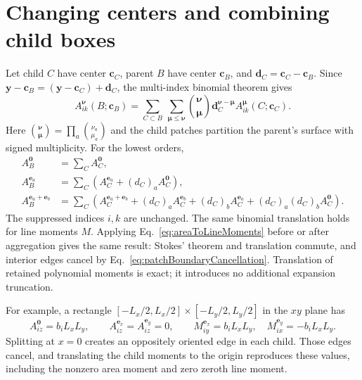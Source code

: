 \section{Changing centers and combining child boxes}
Let child $C$ have center $\bm c_C$, parent $B$ have center $\bm c_B$, and $\bm d_C=\bm c_C-\bm c_B$. Since
$\bm y-\bm c_B=(\bm y-\bm c_C)+\bm d_C$, the multi-index binomial theorem gives
\begin{equation}
 \boxed{A_{ik}^{\boldsymbol\nu}(B;\bm c_B)
 =\sum_{C\subset B}\ \sum_{\boldsymbol\mu\le\boldsymbol\nu}
 {\boldsymbol\nu\choose\boldsymbol\mu}
 \bm d_C^{\boldsymbol\nu-\boldsymbol\mu}
 A_{ik}^{\boldsymbol\mu}(C;\bm c_C).}
 \label{eq:patchM2M}
\end{equation}
Here ${\boldsymbol\nu\choose\boldsymbol\mu}=\prod_a{\nu_a\choose\mu_a}$ and the child patches partition the parent's surface with signed multiplicity. For the lowest orders,
\begin{align}
 A^{\boldsymbol0}_B&=\sum_C A^{\boldsymbol0}_C,\\
 A^{\bm e_a}_B&=\sum_C\left(A^{\bm e_a}_C+(d_C)_aA^{\boldsymbol0}_C\right),\\
 A^{\bm e_a+\bm e_b}_B
 &=\sum_C\left(A^{\bm e_a+\bm e_b}_C
 +(d_C)_aA^{\bm e_b}_C+(d_C)_bA^{\bm e_a}_C
 +(d_C)_a(d_C)_bA^{\boldsymbol0}_C\right).
\end{align}
The suppressed indices $i,k$ are unchanged. The same binomial translation holds for line moments $M$. Applying Eq.~\eqref{eq:areaToLineMoments} before or after aggregation gives the same result: Stokes' theorem and translation commute, and interior edges cancel by Eq.~\eqref{eq:patchBoundaryCancellation}. Translation of retained polynomial moments is exact; it introduces no additional expansion truncation.

For example, a rectangle $[-L_x/2,L_x/2]\times[-L_y/2,L_y/2]$ in the $xy$ plane has
\begin{equation}
 A_{iz}^{\boldsymbol0}=b_iL_xL_y,\qquad
 A_{iz}^{\bm e_x}=A_{iz}^{\bm e_y}=0,\qquad
 M_{iy}^{\bm e_x}=b_iL_xL_y,\quad M_{ix}^{\bm e_y}=-b_iL_xL_y.
\end{equation}
Splitting at $x=0$ creates an oppositely oriented edge in each child. Those edges cancel, and translating the child moments to the origin reproduces these values, including the nonzero area moment and zero zeroth line moment.

